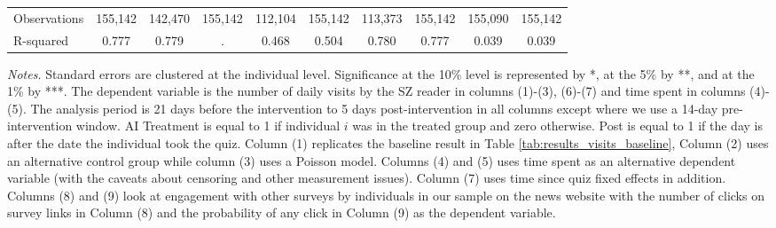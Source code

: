 \begin{table}[H]
\begin{adjustbox}{max width=\textwidth}
\begin{tabular}{lccccccccc}
 \midrule
Observations &    155,142 &    142,470 &    155,142 &    112,104 &    155,142 &    113,373 &    155,142 &    155,090 &    155,142  \\
R-squared&      0.777 &      0.779 &          . &      0.468 &      0.504 &      0.780 &      0.777 &      0.039 &      0.039  \\
 \midrule
 \bottomrule
 \end{tabular}
 \end{adjustbox}
 \par
 \begin{minipage}{1\linewidth}
 \baselineskip9pt {\scriptsize \vspace{0.1cm} { \it Notes.} Standard errors are clustered at the individual level. Significance at the 10\% level is represented by *, at the 5\% by **, and at the 1\% by ***. The dependent variable is the number of daily visits by the SZ reader in columns (1)-(3), (6)-(7) and time spent in columns (4)-(5). The analysis period is 21 days before the intervention to 5 days post-intervention in all columns except where we use a 14-day pre-intervention window. AI Treatment is equal to 1 if individual $i$ was in the treated group and zero otherwise. Post is equal to 1 if the day is after the date the individual took the quiz. Column (1) replicates the baseline result in Table \ref{tab:results_visits_baseline}, Column (2) uses an alternative control group while column (3) uses a Poisson model. Columns (4) and (5) uses time spent as an alternative dependent variable (with the caveats about censoring and other measurement issues). Column (7) uses time since quiz fixed effects in addition. Columns (8) and (9) look at engagement with other surveys by individuals in our sample on the news website with the number of clicks on survey links in Column (8) and the probability of any click in Column (9) as the dependent variable.}
 \end{minipage}
 \end{table}
